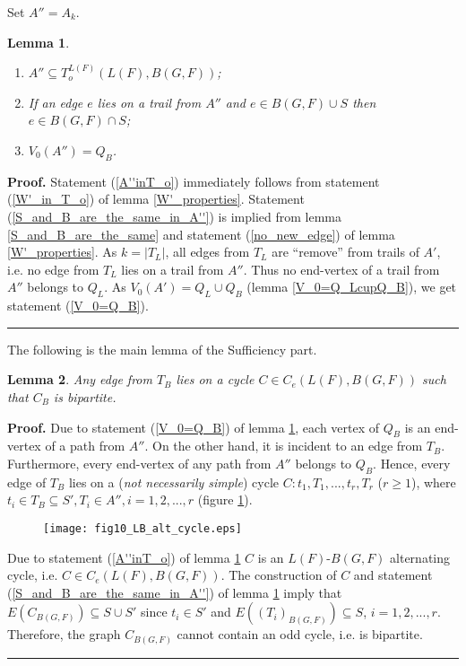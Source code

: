 \documentclass[a4paper, 12pt]{article}
\newtheorem{lemma}{Lemma}[subsection]
\newenvironment{proof}[1][Proof]{\noindent\textbf{#1.} }{\ \rule{0.5em}{0.5em}}
\begin{document}
Set $A'' = A_k$.
\begin{lemma}\label{A''_properties}\
\renewcommand{\labelenumi}{(\arabic{enumi})}
\begin{enumerate}
\item \label{A''inT_o} $A'' \subseteq T_o^{L(F)}(L(F), B(G,F))$;
\item \label{S_and_B_are_the_same_in_A''} If an edge $e$ lies on a
trail from $A''$  and $e \in B(G,F) \cup S$ then $e \in B(G,F) \cap
S$;
\item \label{V_0=Q_B} $V_0(A'') = Q_B$.
\end{enumerate}
\end{lemma}
\begin{proof}
Statement (\ref{A''inT_o}) immediately follows from statement
(\ref{W'_in_T_o}) of lemma \ref{W'_properties}. Statement
(\ref{S_and_B_are_the_same_in_A''}) is implied from lemma
\ref{S_and_B_are_the_same} and statement (\ref{no_new_edge}) of
lemma \ref{W'_properties}. As $k = |T_L|$, all edges from $T_L$ are
``remove'' from trails of $A'$, i.e. no edge from $T_L$ lies on a
trail from $A''$. Thus no end-vertex of a trail from $A''$ belongs
to $Q_L$. As $V_0(A') = Q_L \cup Q_B$ (lemma \ref{V_0=Q_LcupQ_B}),
we get statement (\ref{V_0=Q_B}).
\end{proof}

The following is the main lemma of the Sufficiency part.
\begin{lemma}\label{LB_alt_cycles}
Any edge from $T_B$ lies on a cycle $C \in C_e(L(F), B(G,F))$ such
that $C_B$ is bipartite.
\end{lemma}
\begin{proof}
Due to statement (\ref{V_0=Q_B}) of lemma \ref{A''_properties}, each
vertex of $Q_B$ is an end-vertex of a path from $A''$. On the other
hand, it is incident to an edge from $T_B$. Furthermore, every
end-vertex of any path from $A''$ belongs to $Q_B$. Hence, every
edge of $T_B$ lies on a ({\em not necessarily simple}) cycle $C :
t_1, T_1, ..., t_r, T_r$ ($r \geq 1$), where $t_i \in T_B \subseteq
S', T_i \in A'', i = 1, 2, ..., r$ (figure \ref{fig_LB_alt_cycle}).

\begin{figure}[h]
\begin{center}
\texttt{[image: fig10\_LB\_alt\_cycle.eps]}\\
\caption{}\label{fig_LB_alt_cycle}
\end{center}
\end{figure}

Due to statement (\ref{A''inT_o}) of lemma \ref{A''_properties} $C$
is an $L(F)$-$B(G,F)$ alternating cycle, i.e. $C \in C_e(L(F),
B(G,F))$. The construction of $C$ and statement
(\ref{S_and_B_are_the_same_in_A''}) of lemma \ref{A''_properties}
imply that $E(C_{B(G,F)}) \subseteq S \cup S'$ since $t_i \in S'$
and $E((T_i)_{B(G,F)}) \subseteq S$, $i = 1, 2, ..., r$. Therefore,
the graph $C_{B(G,F)}$ cannot contain an odd cycle, i.e. is
bipartite.
\end{proof}
\end{document}
